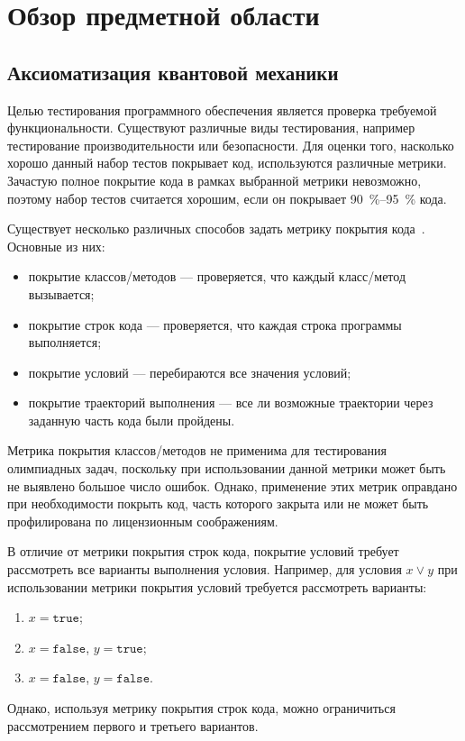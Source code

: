 \chapter{Обзор предметной области}
\label{chapter1}

\section{Аксиоматизация квантовой механики}
Целью тестирования программного обеспечения является проверка требуемой функциональности. Существуют различные виды тестирования, например тестирование 
производительности или безопасности. Для оценки того, насколько хорошо данный набор тестов покрывает код, используются различные метрики. Зачастую полное 
покрытие кода в рамках выбранной метрики невозможно, поэтому набор тестов считается хорошим, если он покрывает 90~\%--95~\% кода.

Существует несколько различных способов задать метрику покрытия кода~\cite{ipl_cite,too_old_metrics}. Основные из них:
\begin{itemize}
 \item покрытие классов/методов --- проверяется, что каждый класс/метод вызывается;
 \item покрытие строк кода --- проверяется, что каждая строка программы выполняется;
 \item покрытие условий --- перебираются все значения условий;
 \item покрытие траекторий выполнения --- все ли возможные траектории через заданную часть кода были пройдены. 
\end{itemize}

Метрика покрытия классов/методов не применима для тестирования олимпиадных задач, поскольку при использовании данной метрики может быть не выявлено большое 
число ошибок. Однако, применение этих метрик оправдано при необходимости покрыть код, часть которого закрыта или не может быть профилирована по лицензионным 
соображениям.

В отличие от метрики покрытия строк кода, покрытие условий требует рассмотреть все варианты выполнения условия. Например, для условия $x \vee y$ при 
использовании метрики покрытия условий требуется рассмотреть варианты:
\begin{enumerate}
 \item $x = \texttt{true}$;
 \item $x = \texttt{false}$, $y = \texttt{true}$;
 \item $x = \texttt{false}$, $y = \texttt{false}$.
\end{enumerate}
Однако, используя метрику покрытия строк кода, можно ограничиться рассмотрением первого и третьего вариантов.

